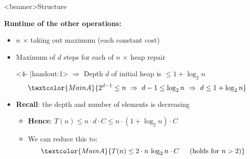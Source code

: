 \setcounter{subsubsection}{0}

\begin{frame}<beamer>{Structure}
\end{frame}

\begin{frame}
  \textbf{Runtime of the other operations:}
  \begin{itemize}
    \item<2- |handout:1>
      {\color{MainA}$n$} $\times$ taking out maximum (each constant cost)
    \item<3- |handout:1>
      Maximum of {\color{MainA}$d$} steps for each of {\color{MainA}$n$} $\times$ heap repair
    \item[]<4- |handout:1>
      $\Rightarrow$ Depth {\color{MainA}$d$} of initial heap is {\color{MainA}$\leq 1 + \log_2 n$}
      \begin{displaymath}
        \textcolor{MainA}{
          2^{d-1} \leq n
          ~\Rightarrow~
          d - 1 \leq \log_2 n
          ~\Rightarrow~
          d \leq 1 + \log_2 n
        }
      \end{displaymath}
    \item<5- |handout:1>
      \textbf{Recall}: the depth and number of elements is decreasing
      \begin{itemize}
        \item<6- |handout:1>
          \textbf{Hence}:
          {\color{MainA}$T(n) \leq n \cdot d \cdot C \leq n \cdot (1 +\log_2 n) \cdot C$}
        \item<7- |handout:1>
          We can reduce this to:
          \begin{displaymath}
            \textcolor{MainA}{
              T(n) \leq 2 \cdot n  \, \log_2 n \cdot C
              \hspace{1.5em} (\text{holds for}~n > 2)
            }
          \end{displaymath}
      \end{itemize}
  \end{itemize}
\end{frame}


